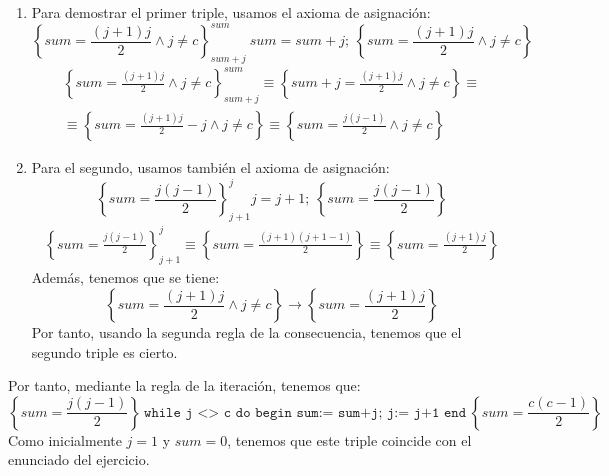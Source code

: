 \begin{ejercicio}
    \begin{enumerate}
        \item Para demostrar el primer triple, usamos el axioma de asignación:
            \begin{equation*}
                \left\{sum = \frac{(j+1)j}{2} \land j \neq c\right\}^{sum}_{sum+j}\ sum = sum + j;\ \left\{sum = \frac{(j+1)j}{2} \land j \neq c\right\} 
            \end{equation*}
            \begin{gather*}
                \left\{sum = \frac{(j+1)j}{2} \land j \neq c\right\}^{sum}_{sum+j} \equiv \left\{sum+j = \frac{(j+1)j}{2} \land j \neq c\right\} \equiv \\ 
                \equiv \left\{sum = \frac{(j+1)j}{2}-j \land j \neq c\right\} \equiv \left\{sum = \frac{j(j-1)}{2} \land j \neq c\right\}
            \end{gather*}
        \item Para el segundo, usamos también el axioma de asignación:
            \begin{equation*}
                \left\{sum = \frac{j(j-1)}{2}\right\}^j_{j+1} j=j+1;\ \left\{sum = \frac{j(j-1)}{2}\right\}
            \end{equation*}
            \begin{gather*}
                \left\{sum = \frac{j(j-1)}{2}\right\}^j_{j+1} \equiv \left\{sum = \frac{(j+1)(j+1-1)}{2}\right\} \equiv \left\{sum = \frac{(j+1)j}{2}\right\}
            \end{gather*}
            Además, tenemos que se tiene:
            \begin{equation*}
                \left\{sum = \frac{(j+1)j}{2} \land j \neq c\right\} \rightarrow \left\{sum = \frac{(j+1)j}{2}\right\}
            \end{equation*}
            Por tanto, usando la segunda regla de la consecuencia, tenemos que el segundo triple es cierto.
    \end{enumerate}

    Por tanto, mediante la regla de la iteración, tenemos que:
    \begin{equation*}
        \left\{sum=\frac{j(j-1)}{2}\right\}\ \texttt{while j <> c do begin sum:= sum+j; j:= j+1 end}\ \left\{sum=\frac{c(c-1)}{2}\right\}
    \end{equation*}
    Como inicialmente $j=1$ y $sum=0$, tenemos que este triple coincide con el enunciado del ejercicio.
\end{ejercicio}

